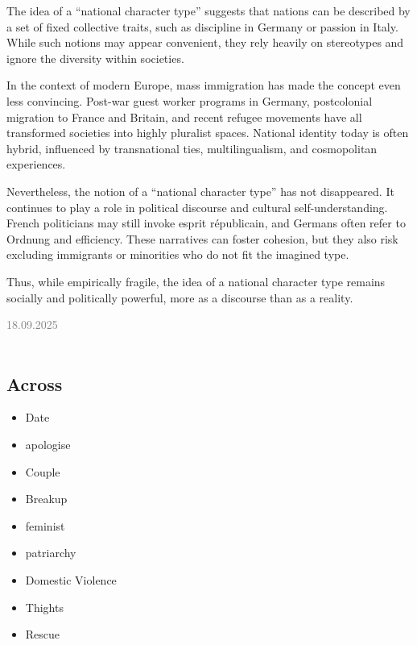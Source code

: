 \documentclass[11pt,a4paper,oneside]{article}
\newcommand{\lessondate}[1]{
	\noindent\hfill\textcolor{gray}{\textsc{#1}} \\
	\vspace{0.5cm}
}
\begin{document}
	The idea of a “national character type” suggests that nations can be described by a set of fixed collective traits, such as discipline in Germany or passion in Italy. While such notions may appear convenient, they rely heavily on stereotypes and ignore the diversity within societies. %
	
	In the context of modern Europe, mass immigration has made the concept even less convincing. Post-war guest worker programs in Germany, postcolonial migration to France and Britain, and recent refugee movements have all transformed societies into highly pluralist spaces. National identity today is often hybrid, influenced by transnational ties, multilingualism, and cosmopolitan experiences. %
	
	Nevertheless, the notion of a “national character type” has not disappeared. It continues to play a role in political discourse and cultural self-understanding. French politicians may still invoke esprit républicain, and Germans often refer to Ordnung and efficiency. These narratives can foster cohesion, but they also risk excluding immigrants or minorities who do not fit the imagined type.
	
	Thus, while empirically fragile, the idea of a national character type remains socially and politically powerful, more as a discourse than as a reality.
	
	
	\newpage
	
	\lessondate{18.09.2025}\\
	
	\subsection*{Across}
	\begin{itemize}
		\item Date
		\item apologise 
		\item Couple 
		\item Breakup 
		\item feminist 
		\item patriarchy 
		\item Domestic Violence 
		\item Thights 
		\item Rescue 
	\end{itemize}
	
\end{document}
